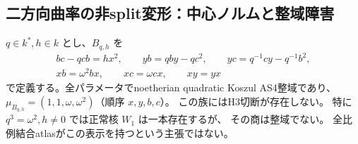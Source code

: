 \subsection{二方向曲率の非split変形：中心ノルムと整域障害}
\label{subsec:cubic-third-root-unit-deformed-double-Ore}
\begin{theorem}[指定二方向曲率変形族の全排除]
\label{thm:cubic-third-root-unit-deformed-double-Ore-empty}
$q\in k^*,h\in k$ とし、$B_{q,h}$ を
\begin{gather*}
 bc-qcb=h x^2,\qquad yb=qby-qc^2,\qquad yc=q^{-1}cy-q^{-1}b^2,\\
 xb=\omega^2bx,\qquad xc=\omega cx,\qquad xy=yx
\end{gather*}
で定義する。全パラメータでnoetherian quadratic Koszul AS4整域であり、
$\mu_{B_{q,h}}=(1,1,\omega,\omega^2)$（順序 $x,y,b,c$）。
この族にはH3切断が存在しない。
特に $q^3=\omega^2,h\ne0$ では正常核 $W_1$ は一本存在するが、
その商は整域でない。
全比例結合atlasがこの表示を持つという主張ではない。
\end{theorem}
